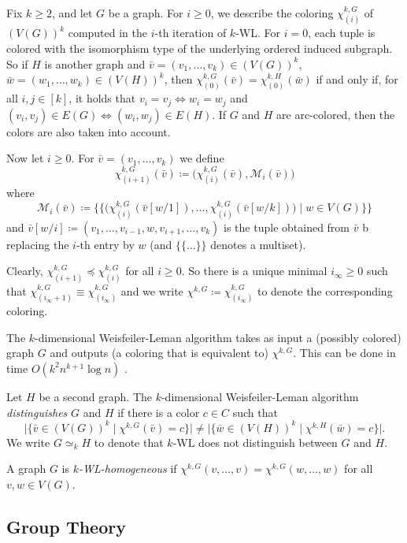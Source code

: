 \documentclass{theoretics}
\newcommand{\CM}{{\mathcal M}}
\newcommand{\Bigmid}{\;\Big|\;}
\newcommand{\WL}[2]{\chi^{#1,#2}}
\newcommand{\WLit}[3]{\chi_{(#2)}^{#1,#3}}
\begin{document}
Fix $k \geq 2$, and let $G$ be a graph.
For $i \geq 0$, we describe the coloring $\WLit{k}{i}{G}$ of $(V(G))^k$ computed in the $i$-th iteration of $k$-WL.
For $i = 0$, each tuple is colored with the isomorphism type of the underlying ordered induced subgraph.
So if $H$ is another graph and $\bar v = (v_1,\dots,v_k) \in (V(G))^k$, $\bar w = (w_1,\dots,w_k) \in (V(H))^k$,
then $\WLit{k}{0}{G}(\bar v) = \WLit{k}{0}{H}(\bar w)$ if and only if, for all $i,j \in [k]$, it holds that $v_i = v_j \Leftrightarrow w_i = w_j$ and $(v_i,v_j) \in E(G) \Leftrightarrow (w_i,w_j) \in E(H)$.
If $G$ and $H$ are arc-colored, then the colors are also taken into account.

Now let $i \geq 0$.
For $\bar v = (v_1,\dots,v_k)$ we define
\[\WLit{k}{i+1}{G}(\bar v) \coloneqq \Big(\WLit{k}{i}{G}(\bar v), \CM_{i}(\bar v)\Big)\]
where
\[\CM_i(\bar v) \coloneqq \Big\{\!\Big\{ \big(\WLit{k}{i}{G}(\bar v[w/1]),\dots,\WLit{k}{i}{G}(\bar v[w/k])\big) \Bigmid w \in V(G) \Big\}\!\Big\}\]
and $\bar v[w/i] \coloneqq (v_1,\dots,v_{i-1},w,v_{i+1},\dots,v_k)$ is the tuple obtained from $\bar v$ b replacing the $i$-th entry by $w$ (and $\{\!\{\dots\}\!\}$ denotes a multiset).

Clearly, $\WLit{k}{i+1}{G} \preceq \WLit{k}{i}{G}$ for all $i \geq 0$.
So there is a unique minimal $i_\infty \geq 0$ such that $\WLit{k}{i_\infty+1}{G} \equiv \WLit{k}{i_\infty}{G}$ and we write $\WL{k}{G} \coloneqq \WLit{k}{i_\infty}{G}$ to denote the corresponding coloring.

The $k$-dimensional Weisfeiler-Leman algorithm takes as input a (possibly colored) graph $G$ and outputs (a coloring that is equivalent to) $\WL{k}{G}$.
This can be done in time $O(k^2n^{k+1} \log n)$ \cite{ImmermanL90}.

Let $H$ be a second graph.
The $k$-dimensional Weisfeiler-Leman algorithm \emph{distinguishes} $G$ and $H$ if there is a color $c \in C$ such that
\[\Big|\Big\{ \bar v \in (V(G))^k \Bigmid \WL{k}{G}(\bar v) = c \Big\}\Big| \neq \Big|\Big\{ \bar w \in (V(H))^k \Bigmid \WL{k}{H}(\bar w) = c \Big\}\Big|.\]
We write $G \simeq_k H$ to denote that $k$-WL does not distinguish between $G$ and $H$.

A graph $G$ is \emph{$k$-WL-homogeneous} if $\WL{k}{G}(v,\dots,v) = \WL{k}{G}(w,\dots,w)$ for all $v,w\in V(G)$.


\subsection{Group Theory}
\label{sec:groups}
\end{document}
